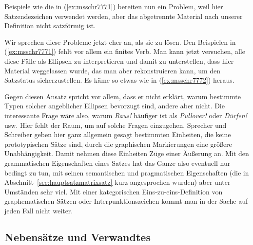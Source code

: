 Beispiele wie die in (\ref{ex:msschr7771}) bereiten nun ein Problem, weil hier Satzendezeichen verwendet werden, aber das abgetrennte Material nach unserer Definition nicht satzförmig ist.

\begin{exe}
  \ex\label{ex:msschr7771}
  \begin{xlist}
  \end{xlist}
\end{exe}

Wir sprechen diese Probleme jetzt eher an, als sie zu lösen.
Den Beispielen in (\ref{ex:msschr7771}) fehlt vor allem ein finites Verb.
Man kann jetzt versuchen, alle diese Fälle als Ellipsen zu interpretieren und damit zu unterstellen, dass hier Material weggelassen wurde, das man aber rekonstruieren kann, um den Satzstatus sicherzustellen.
Es käme so etwas wie in (\ref{ex:msschr7772}) heraus.

\begin{exe}
  \ex\label{ex:msschr7772}
  \begin{xlist}
  \end{xlist}
\end{exe}

Gegen diesen Ansatz spricht vor allem, dass er nicht erklärt, warum bestimmte Typen solcher angeblicher Ellipsen bevorzugt sind, andere aber nicht.
Die interessante Frage wäre also, warum \textit{Raus!} häufiger ist als \textit{Pullover!} oder \textit{Dürfen!} usw.
Hier fehlt der Raum, um auf solche Fragen einzugehen.
Sprecher und Schreiber geben hier ganz allgemein gesagt bestimmten Einheiten, die keine prototypischen Sätze sind, durch die graphischen Markierungen eine größere Unabhängigkeit.
Damit nehmen diese Einheiten Züge einer Äußerung an.
Mit den grammatischen Eigenschaften eines Satzes hat das Ganze also eventuell nur bedingt zu tun, mit seinen semantischen und pragmatischen Eigenschaften (die in Abschnitt~\ref{sec:hauptsatzmatrixsatz} kurz angesprochen wurden) aber unter Umständen sehr viel.
Mit einer kategorischen Eins-zu-eins-Definition von graphematischen Sätzen oder Interpunktionszeichen kommt man in der Sache auf jeden Fall nicht weiter.

\subsection{Nebensätze und Verwandtes}

